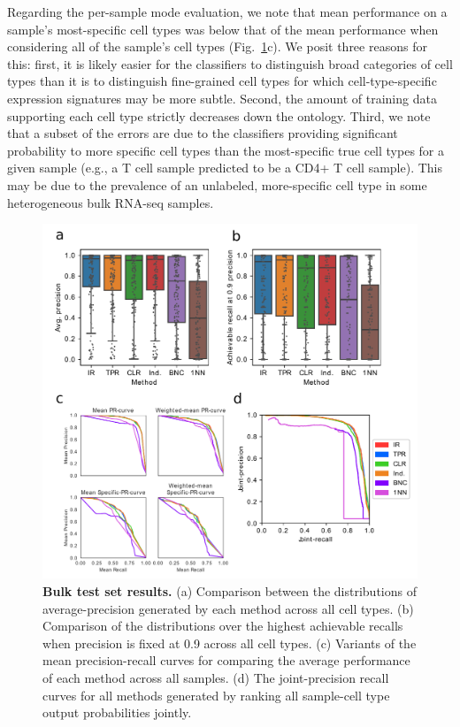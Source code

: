 Regarding the per-sample mode evaluation, we note that mean performance on a sample's most-specific cell types was below that of the mean performance when considering all of the sample's cell types (Fig.~\ref{fig:results_test_bulk}c).  We posit three reasons for this: first, it is likely easier for the classifiers to distinguish broad categories of cell types than it is to distinguish fine-grained cell types for which cell-type-specific expression signatures may be more subtle. Second, the amount of training data supporting each cell type strictly decreases down the ontology. Third, we note that a subset of the errors are due to the classifiers providing significant probability to more specific cell types than the most-specific true cell types for a given sample (e.g., a T cell sample predicted to be a CD4+ T cell sample). This may be due to the prevalence of an unlabeled, more-specific cell type in some heterogeneous bulk RNA-seq samples.     

\begin{figure}[h!]
      \centerline{\includegraphics[width=13cm]{figures/bulk_test_set_results.pdf}}
      \caption{\textbf{Bulk test set results.} (a) Comparison between the distributions of average-precision generated by each method across all cell types.  (b) Comparison of the distributions over the highest achievable recalls when precision is fixed at 0.9 across all cell types. (c) Variants of the mean precision-recall curves for comparing the average performance of each method across all samples. (d) The joint-precision recall curves for all methods generated by ranking all sample-cell type output probabilities jointly.}
      \label{fig:results_test_bulk}
      \end{figure}

